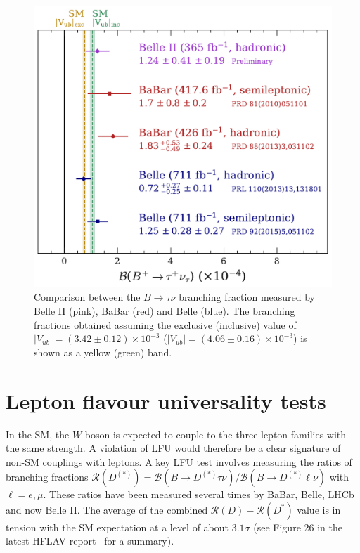 \documentclass{moriond}
\def\vub{V_{ub}}
\def\rd{\mathcal{R}\left(D\right)}
\def\rdst{\mathcal{R}\left(D^*\right)}
\def\rddst{\mathcal{R}\left(D^{(*)}\right)}
\begin{document}
\begin{figure}[h!]
    \centering
    \includegraphics[scale=0.4]{Final_Unblinding_.pdf}
    \caption{Comparison between the $B \to \tau\nu$ branching fraction measured by Belle II (pink), BaBar (red) and Belle (blue). The branching fractions obtained assuming the exclusive (inclusive) value of $|\vub| = (3.42 \pm 0.12)\times 10^{-3}$ ($|\vub| = (4.06 \pm 0.16)\times 10^{-3}$) is shown as a yellow (green) band.}
    \label{fig:Final_Unblinding_}
\end{figure}

\section{Lepton flavour universality tests}
In the SM, the $W$ boson is expected to couple to the three lepton families with the same strength. A violation of LFU would therefore be a clear signature of non-SM couplings with leptons. A key LFU test involves measuring the ratios of branching fractions $\rddst = \mathcal{B}(B \to D^{(*)}\tau\nu)/\mathcal{B}(B \to D^{(*)}\ell\nu)$ with $\ell=e,\mu$. These ratios have been measured several times by BaBar, Belle, LHCb and now Belle II. The average of the combined $\rd-\rdst$ value is in tension with the SM expectation at a level of about $3.1\sigma$ (see Figure 26 in the latest HFLAV report~\cite{hflav} for a summary).
\end{document}
